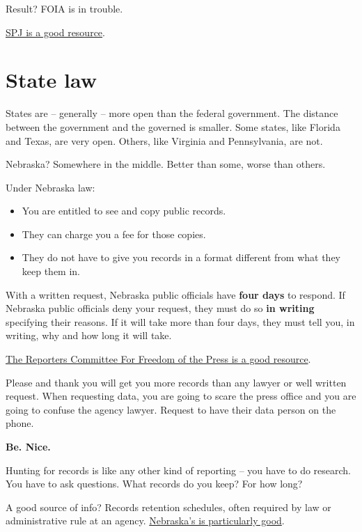 \documentclass[]{book}
\providecommand{\tightlist}{%
  \setlength{\itemsep}{0pt}\setlength{\parskip}{0pt}}
\begin{document}
Result? FOIA is in trouble.

\href{https://www.spj.org/foi-guide-pros.asp}{SPJ is a good resource}.

\hypertarget{state-law}{%
\section{State law}\label{state-law}}

States are -- generally -- more open than the federal government. The distance between the government and the governed is smaller. Some states, like Florida and Texas, are very open. Others, like Virginia and Pennsylvania, are not.

Nebraska? Somewhere in the middle. Better than some, worse than others.

Under Nebraska law:

\begin{itemize}
\tightlist
\item
  You are entitled to see and copy public records.
\item
  They can charge you a fee for those copies.
\item
  They do not have to give you records in a format different from what they keep them in.
\end{itemize}

With a written request, Nebraska public officials have \textbf{four days} to respond. If Nebraska public officials deny your request, they must do so \textbf{in writing} specifying their reasons. If it will take more than four days, they must tell you, in writing, why and how long it will take.

\href{https://www.rcfp.org/open-government-guide/nebraska/}{The Reporters Committee For Freedom of the Press is a good resource}.

Please and thank you will get you more records than any lawyer or well written request. When requesting data, you are going to scare the press office and you are going to confuse the agency lawyer. Request to have their data person on the phone.

\textbf{Be. Nice.}

Hunting for records is like any other kind of reporting -- you have to do research. You have to ask questions. What records do you keep? For how long?

A good source of info? Records retention schedules, often required by law or administrative rule at an agency. \href{http://www.sos.ne.gov/records-management/retention_schedules.html}{Nebraska's is particularly good}.
\end{document}
